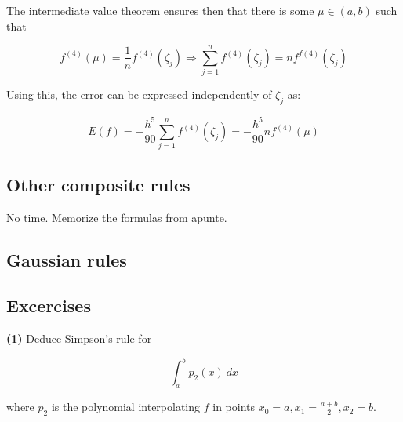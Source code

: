 \documentclass[12pt]{article}
\theoremstyle{definition}
\begin{document}
The intermediate value theorem ensures then that there is some $\mu \in (a, b)$ such that 

\begin{equation*}
    f^{(4)}(\mu) = \frac{1}{n} f^{(4)}(\zeta_j) \Rightarrow \sum_{j=1}^n
    f^{(4)}(\zeta_j) = n f^{f(4)}(\zeta_j)
\end{equation*}

Using this, the error can be expressed independently of $\zeta_j$ as:

\begin{equation*}
    E(f) = -\frac{h^5}{90} \sum_{j=1}^n f^{(4)}(\zeta_j) = -\frac{h^5}{90}
    nf^{(4)}(\mu)
\end{equation*}

\subsection{Other composite rules}

No time. Memorize the formulas from apunte.

\pagebreak 

\subsection{Gaussian rules}

\pagebreak 

\subsection{Excercises}

\begin{shaded}
    \textbf{(1)} Deduce Simpson's rule for

    \begin{equation*}
        \int_a^b p_2(x) ~ dx
    \end{equation*}

    where $p_2$ is the polynomial interpolating $f$ in points 
    $x_0 = a, x_1 = \frac{a+b}{2}, x_2 = b$.


\end{shaded}
\end{document}
